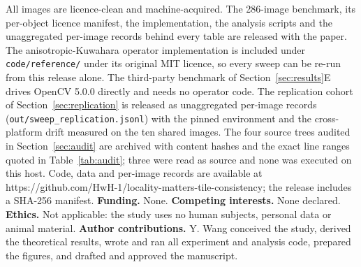\documentclass[journal]{IEEEtran}
\begin{document}
All images are licence-clean and machine-acquired. The 286-image benchmark, its per-object licence manifest, the implementation, the analysis scripts and the unaggregated per-image records behind every table are released with the paper. The anisotropic-Kuwahara operator implementation is included under \texttt{code/reference/} under its original MIT licence, so every sweep can be re-run from this release alone. The third-party benchmark of Section~\ref{sec:results}E drives OpenCV 5.0.0 directly and needs no operator code. The replication cohort of Section~\ref{sec:replication} is released as unaggregated per-image records (\texttt{out/sweep\_replication.jsonl}) with the pinned environment and the cross-platform drift measured on the ten shared images. The four source trees audited in Section~\ref{sec:audit} are archived with content hashes and the exact line ranges quoted in Table~\ref{tab:audit}; three were read as source and none was executed on this host. Code, data and per-image records are available at https://github.com/HwH-1/locality-matters-tile-consistency; the release includes a SHA-256 manifest. \textbf{Funding.} None. \textbf{Competing interests.} None declared. \textbf{Ethics.} Not applicable: the study uses no human subjects, personal data or animal material. \textbf{Author contributions.} Y. Wang conceived the study, derived the theoretical results, wrote and ran all experiment and analysis code, prepared the figures, and drafted and approved the manuscript.



\end{document}
